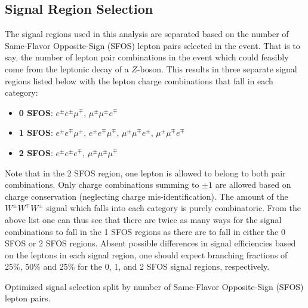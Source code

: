 \subsection{Signal Region Selection}
\label{sec:signal_regions}
The signal regions used in this analysis are separated based on the number of 
Same-Flavor Opposite-Sign (SFOS) lepton pairs selected in the event.  That is to say,
the number of lepton pair combinations in the event 
which could feasibly come from the leptonic decay of a $Z$-boson.
This results in three separate signal regions listed 
below with the lepton charge combinations
that fall in each category:
\begin{itemize}
\item \textbf{0 SFOS}: $e^{\pm}e^{\pm}\mu^{\mp}$, 
$\mu^{\pm}\mu^{\pm}e^{\mp}$ 
\item \textbf{1 SFOS}: $e^{\pm}e^{\mp}\mu^{\pm}$, 
$e^{\pm}e^{\mp}\mu^{\mp}$, $\mu^{\pm}\mu^{\mp}e^{\pm}$, $\mu^{\pm}\mu^{\mp}e^{\mp}$
\item \textbf{2 SFOS}: $e^{\pm}e^{\pm}e^{\mp}$, $\mu^{\pm}\mu^{\pm}\mu^{\mp}$
\end{itemize}
Note that in the 2 SFOS region, one lepton is allowed to belong to both 
pair combinations.
Only charge combinations summing to $\pm 1$ are allowed based on charge
conservation (neglecting charge mis-identification).  
The amount of the $W^{\pm}W^{\mp}W^{\pm}$ signal
which falls into each category is purely combinatoric.  
From the above list one can thus see that there are twice as many ways 
for the signal combinations to fall in the 1 SFOS regions as 
there are to fall in either the 0 SFOS or 2 SFOS regions. 
Absent possible differences in signal efficiencies based on the leptons in each 
signal region, one should expect branching 
fractions of 25\%, 50\% and 25\% for the 0, 1, and 2 SFOS signal regions, respectively.


\begin{table}[ht!]
\centering
\begin{small}

\end{small}
\caption{Optimized signal selection split by number of Same-Flavor 
Opposite-Sign (SFOS) lepton pairs.}
\label{tab:signal_selection}
\end{table}

%

